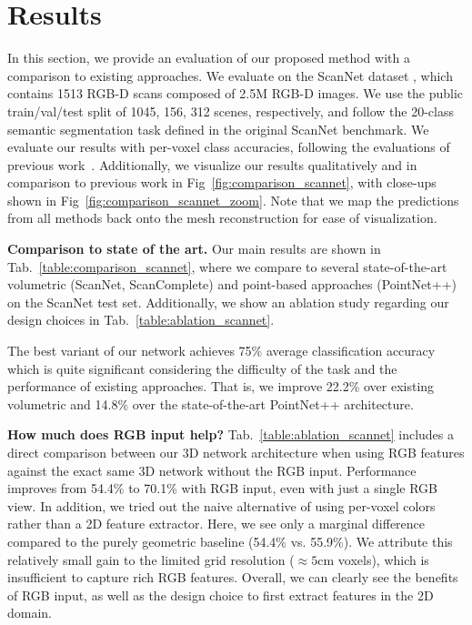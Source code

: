 

\section{Results}
\label{sec:results}

In this section, we provide an evaluation of our proposed method with a comparison to existing approaches.
We evaluate on the ScanNet dataset \cite{dai2017scannet}, which contains 1513 RGB-D scans composed of 2.5M RGB-D images.
We use the public train/val/test split of 1045, 156, 312 scenes, respectively, and follow the 20-class semantic segmentation task defined in the original ScanNet benchmark.
We evaluate our results with per-voxel class accuracies, following the evaluations of previous work~\cite{dai2017scannet,qi2017pointnet++,dai2018scancomplete}.
Additionally, we visualize our results qualitatively and in comparison to previous work in Fig~\ref{fig:comparison_scannet}, with close-ups shown in Fig~\ref{fig:comparison_scannet_zoom}. Note that we map the predictions from all methods back onto the mesh reconstruction for ease of visualization.

\vspace{0.2cm}\noindent
\textbf{Comparison to state of the art.}
Our main results are shown in Tab.~\ref{table:comparison_scannet}, where we compare to several state-of-the-art volumetric (ScanNet\cite{dai2017scannet}, ScanComplete\cite{dai2018scancomplete}) and point-based approaches (PointNet++\cite{qi2017pointnet++}) on the ScanNet test set.
Additionally, we show an ablation study regarding our design choices in Tab.~\ref{table:ablation_scannet}.

The best variant of our \OURS{} network achieves 75\% average classification accuracy which is quite significant considering the difficulty of the task and the performance of existing approaches.
That is, we improve 22.2\% over existing volumetric and 14.8\% over the state-of-the-art PointNet++ architecture. 


\vspace{0.2cm}\noindent
\textbf{How much does RGB input help?}
Tab.~\ref{table:ablation_scannet} includes a direct comparison between our 3D network architecture when using RGB features against the exact same 3D network without the RGB input.
Performance improves from 54.4\% to 70.1\% with RGB input, even with just a single RGB view.
In addition, we tried out the naive alternative of using per-voxel colors rather than a 2D feature extractor.
Here, we see only a marginal difference compared to the purely geometric baseline (54.4\% vs. 55.9\%).
We attribute this relatively small gain to the limited grid resolution ($\approx 5$cm voxels), which is insufficient to capture rich RGB features.
Overall, we can clearly see the benefits of RGB input, as well as the design choice to first extract features in the 2D domain.

